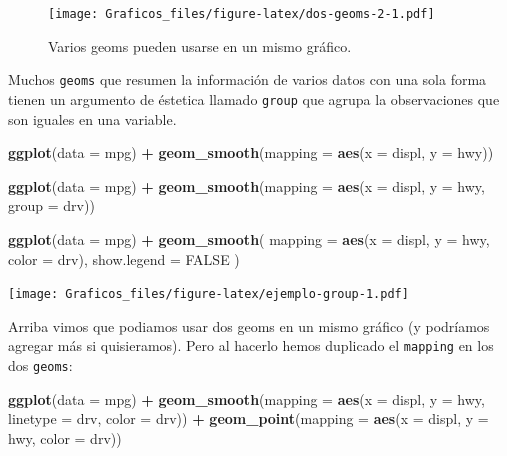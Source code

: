 \documentclass[]{book}
\newenvironment{Shaded}{\begin{snugshade}}{\end{snugshade}}
\newcommand{\DataTypeTok}[1]{\textcolor[rgb]{0.13,0.29,0.53}{#1}}
\newcommand{\KeywordTok}[1]{\textcolor[rgb]{0.13,0.29,0.53}{\textbf{#1}}}
\newcommand{\NormalTok}[1]{#1}
\newcommand{\OperatorTok}[1]{\textcolor[rgb]{0.81,0.36,0.00}{\textbf{#1}}}
\newcommand{\OtherTok}[1]{\textcolor[rgb]{0.56,0.35,0.01}{#1}}
\newcommand{\StringTok}[1]{\textcolor[rgb]{0.31,0.60,0.02}{#1}}
\theoremstyle{definition}
\theoremstyle{definition}
\theoremstyle{definition}
\theoremstyle{remark}
\begin{document}
\begin{figure}
\centering
\texttt{[image: Graficos\_files/figure-latex/dos-geoms-2-1.pdf]}
\caption{\label{fig:dos-geoms-2}Varios geoms pueden usarse en un mismo
gráfico.}
\end{figure}

Muchos \texttt{geoms} que resumen la información de varios datos con una
sola forma tienen un argumento de éstetica llamado \texttt{group} que
agrupa la observaciones que son iguales en una variable.

\begin{Shaded}
\begin{Highlighting}[]
\KeywordTok{ggplot}\NormalTok{(}\DataTypeTok{data =}\NormalTok{ mpg) }\OperatorTok{+}
\StringTok{  }\KeywordTok{geom_smooth}\NormalTok{(}\DataTypeTok{mapping =} \KeywordTok{aes}\NormalTok{(}\DataTypeTok{x =}\NormalTok{ displ, }\DataTypeTok{y =}\NormalTok{ hwy))}
              
\KeywordTok{ggplot}\NormalTok{(}\DataTypeTok{data =}\NormalTok{ mpg) }\OperatorTok{+}
\StringTok{  }\KeywordTok{geom_smooth}\NormalTok{(}\DataTypeTok{mapping =} \KeywordTok{aes}\NormalTok{(}\DataTypeTok{x =}\NormalTok{ displ, }\DataTypeTok{y =}\NormalTok{ hwy, }\DataTypeTok{group =}\NormalTok{ drv))}
    
\KeywordTok{ggplot}\NormalTok{(}\DataTypeTok{data =}\NormalTok{ mpg) }\OperatorTok{+}
\StringTok{  }\KeywordTok{geom_smooth}\NormalTok{(}
    \DataTypeTok{mapping =} \KeywordTok{aes}\NormalTok{(}\DataTypeTok{x =}\NormalTok{ displ, }\DataTypeTok{y =}\NormalTok{ hwy, }\DataTypeTok{color =}\NormalTok{ drv),}
    \DataTypeTok{show.legend =} \OtherTok{FALSE}
\NormalTok{  )}
\end{Highlighting}
\end{Shaded}

\texttt{[image: Graficos\_files/figure-latex/ejemplo-group-1.pdf]}

Arriba vimos que podiamos usar dos geoms en un mismo gráfico (y
podríamos agregar más si quisieramos). Pero al hacerlo hemos duplicado
el \texttt{mapping} en los dos \texttt{geoms}:

\begin{Shaded}
\begin{Highlighting}[]
\KeywordTok{ggplot}\NormalTok{(}\DataTypeTok{data =}\NormalTok{ mpg) }\OperatorTok{+}\StringTok{ }
\StringTok{  }\KeywordTok{geom_smooth}\NormalTok{(}\DataTypeTok{mapping =} \KeywordTok{aes}\NormalTok{(}\DataTypeTok{x =}\NormalTok{ displ, }\DataTypeTok{y =}\NormalTok{ hwy, }\DataTypeTok{linetype =}\NormalTok{ drv, }\DataTypeTok{color =}\NormalTok{ drv)) }\OperatorTok{+}
\StringTok{  }\KeywordTok{geom_point}\NormalTok{(}\DataTypeTok{mapping =} \KeywordTok{aes}\NormalTok{(}\DataTypeTok{x =}\NormalTok{ displ, }\DataTypeTok{y =}\NormalTok{ hwy, }\DataTypeTok{color =}\NormalTok{ drv))}
\end{Highlighting}
\end{Shaded}
\end{document}
